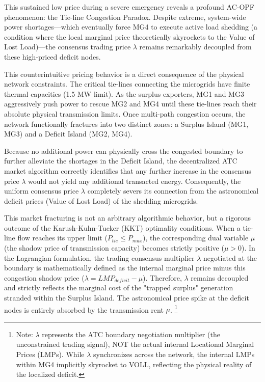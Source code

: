 This sustained low price during a severe emergency reveals a profound AC-OPF phenomenon: the Tie-line Congestion Paradox. Despite extreme, system-wide power shortages---which eventually force MG4 to execute active load shedding (a condition where the local marginal price theoretically skyrockets to the Value of Lost Load)---the consensus trading price $\lambda$ remains remarkably decoupled from these high-priced deficit nodes. 

This counterintuitive pricing behavior is a direct consequence of the physical network constraints. The critical tie-lines connecting the microgrids have finite thermal capacities (1.5 MW limit). As the surplus exporters, MG1 and MG3 aggressively push power to rescue MG2 and MG4 until these tie-lines reach their absolute physical transmission limits. Once multi-path congestion occurs, the network functionally fractures into two distinct zones: a Surplus Island (MG1, MG3) and a Deficit Island (MG2, MG4).

Because no additional power can physically cross the congested boundary to further alleviate the shortages in the Deficit Island, the decentralized ATC market algorithm correctly identifies that any further increase in the consensus price $\lambda$ would not yield any additional transacted energy. Consequently, the uniform consensus price $\lambda$ completely severs its connection from the astronomical deficit prices (Value of Lost Load) of the shedding microgrids.

This market fracturing is not an arbitrary algorithmic behavior, but a rigorous outcome of the Karush-Kuhn-Tucker (KKT) optimality conditions. When a tie-line flow reaches its upper limit ($P_{tie} \le P_{max}$), the corresponding dual variable $\mu$ (the shadow price of transmission capacity) becomes strictly positive ($\mu > 0$). In the Lagrangian formulation, the trading consensus multiplier $\lambda$ negotiated at the boundary is mathematically defined as the internal marginal price minus this congestion shadow price ($\lambda = LMP_{deficit} - \mu$). Therefore, $\lambda$ remains decoupled and strictly reflects the marginal cost of the "trapped surplus" generation stranded within the Surplus Island. The astronomical price spike at the deficit nodes is entirely absorbed by the transmission rent $\mu$. \footnote{Note: $\lambda$ represents the ATC boundary negotiation multiplier (the unconstrained trading signal), NOT the actual internal Locational Marginal Prices (LMPs). While $\lambda$ synchronizes across the network, the internal LMPs within MG4 implicitly skyrocket to VOLL, reflecting the physical reality of the localized deficit.}

